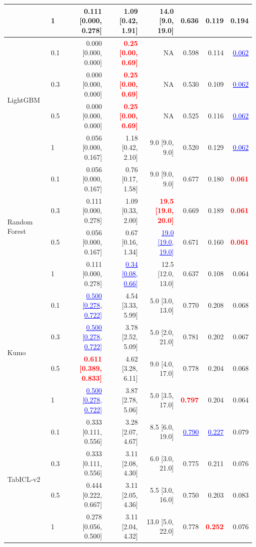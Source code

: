 \begin{table}[pos=!htbp,align=\centering]
{\begin{tabular}{llrrrrrr}
 & 1 & 0.111 [0.000, 0.278] & 1.09 [0.42, 1.91] & 14.0 [9.0, 19.0] & 0.636 & 0.119 & 0.194 \\
\midrule
\multirow{4}{*}{LightGBM} & 0.1 & 0.000 [0.000, 0.000] & \textcolor{red}{\textbf{0.25 [0.00, 0.69]}} & NA & 0.598 & 0.114 & \textcolor{blue}{\underline{0.062}} \\
 & 0.3 & 0.000 [0.000, 0.000] & \textcolor{red}{\textbf{0.25 [0.00, 0.69]}} & NA & 0.530 & 0.109 & \textcolor{blue}{\underline{0.062}} \\
 & 0.5 & 0.000 [0.000, 0.000] & \textcolor{red}{\textbf{0.25 [0.00, 0.69]}} & NA & 0.525 & 0.116 & \textcolor{blue}{\underline{0.062}} \\
 & 1 & 0.056 [0.000, 0.167] & 1.18 [0.42, 2.10] & 9.0 [9.0, 9.0] & 0.520 & 0.129 & \textcolor{blue}{\underline{0.062}} \\
\midrule
\multirow{4}{*}{Random Forest} & 0.1 & 0.056 [0.000, 0.167] & 0.76 [0.17, 1.58] & 9.0 [9.0, 9.0] & 0.677 & 0.180 & \textcolor{red}{\textbf{0.061}} \\
 & 0.3 & 0.111 [0.000, 0.278] & 1.09 [0.33, 2.00] & \textcolor{red}{\textbf{19.5 [19.0, 20.0]}} & 0.669 & 0.189 & \textcolor{red}{\textbf{0.061}} \\
 & 0.5 & 0.056 [0.000, 0.167] & 0.67 [0.16, 1.34] & \textcolor{blue}{\underline{19.0 [19.0, 19.0]}} & 0.671 & 0.160 & \textcolor{red}{\textbf{0.061}} \\
 & 1 & 0.111 [0.000, 0.278] & \textcolor{blue}{\underline{0.34 [0.08, 0.66]}} & 12.5 [12.0, 13.0] & 0.637 & 0.108 & 0.064 \\
\midrule
\multirow{4}{*}{Kumo} & 0.1 & \textcolor{blue}{\underline{0.500 [0.278, 0.722]}} & 4.54 [3.33, 5.99] & 5.0 [3.0, 13.0] & 0.770 & 0.208 & 0.068 \\
 & 0.3 & \textcolor{blue}{\underline{0.500 [0.278, 0.722]}} & 3.78 [2.52, 5.09] & 5.0 [2.0, 21.0] & 0.781 & 0.202 & 0.067 \\
 & 0.5 & \textcolor{red}{\textbf{0.611 [0.389, 0.833]}} & 4.62 [3.28, 6.11] & 9.0 [4.0, 17.0] & 0.778 & 0.204 & 0.068 \\
 & 1 & \textcolor{blue}{\underline{0.500 [0.278, 0.722]}} & 3.87 [2.78, 5.06] & 5.0 [3.5, 17.0] & \textcolor{red}{\textbf{0.797}} & 0.204 & 0.064 \\
\midrule
\multirow{4}{*}{TabICL-v2} & 0.1 & 0.333 [0.111, 0.556] & 3.28 [2.07, 4.67] & 8.5 [6.0, 19.0] & \textcolor{blue}{\underline{0.790}} & \textcolor{blue}{\underline{0.227}} & 0.079 \\
 & 0.3 & 0.333 [0.111, 0.556] & 3.11 [2.08, 4.30] & 6.0 [3.0, 21.0] & 0.775 & 0.211 & 0.076 \\
 & 0.5 & 0.444 [0.222, 0.667] & 3.11 [2.05, 4.36] & 5.5 [3.0, 16.0] & 0.750 & 0.203 & 0.083 \\
 & 1 & 0.278 [0.056, 0.500] & 3.11 [2.04, 4.32] & 13.0 [5.0, 22.0] & 0.778 & \textcolor{red}{\textbf{0.252}} & 0.076 \\
\bottomrule
\end{tabular}
}
\end{table}
